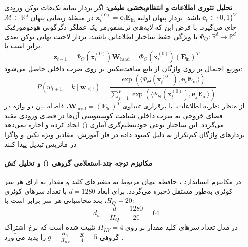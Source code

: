 \textbf{تحلیل تئوری اطلاعات و انتظام‌بخشی طیفی:}
اگر بردار نمایه تک‌هات توکن ورودی $\mathbf{e}_t \in \{0, 1\}^V$ باشد، بردار پنهان اولیه $\mathbf{x}_t^{(0)} = \mathbf{e}_t \mathbf{E}_{\text{in}}$ در منیفلد ریمانی پنهان $\mathcal{M} \subset \mathbb{R}^d$ جای می‌گیرد. با فرض این که لایه‌های ترنسفورمر یک عملگر دگرگونی هومومورفیک $\Phi_\Theta: \mathbb{R}^d \to \mathbb{R}^d$ با ویژگی حفظ ساختار اطلاعاتی باشند، بردار لاجیت نهایی توکن بعدی برابر است با:
\begin{equation}
    \mathbf{z}_{t+1} = \Phi_\Theta(\mathbf{x}_t^{(0)}) \mathbf{W}_{\text{head}} = \Phi_\Theta(\mathbf{x}_t^{(0)}) (\mathbf{E}_{\text{in}})^T
\end{equation}
توزیع احتمال بر روی واژگان از تابع سافت‌مکس بر روی ضرب داخلی حاصل می‌شود:
\begin{equation}
    P(w_{t+1} = k \mid \mathbf{w}_{\le t}) = \frac{\exp\left(\langle \Phi_\Theta(\mathbf{x}_t^{(0)}), \mathbf{e}_k \mathbf{E}_{\text{in}} \rangle\right)}{\sum_{j=1}^V \exp\left(\langle \Phi_\Theta(\mathbf{x}_t^{(0)}), \mathbf{e}_j \mathbf{E}_{\text{in}} \rangle\right)}
\end{equation}
از منظر نظریه اطلاعات، با برقراری تساوی $\mathbf{W}_{\text{head}} = (\mathbf{E}_{\text{in}})^T$، فاصله بین دو واژه در فضای خروجی به ضرب داخلی شباهت کوسینوسی آن‌ها در فضای ورودی مقید می‌گردد. این ساختار نوعی خودتنظیم‌گری آماری () ایجاد کرده و اجازه نمی‌دهد بردارهای واژگان کم‌تکرار به دلیل کمبود داده در فاز آموزش، مقادیر ویژه تکین و واگرا در ماتریس تبدیل پیدا کنند.

\paragraph*{مکانیزم توجه چند-استعلامی گروهی () و تحلیل کش}
در مکانیزم استاندارد ، حافظه پنهان مربوط به متغیرهای کلید و مقدار به ازای هر سر کوئری به‌طور مستقل ذخیره می‌گردد. برای ابعاد $d = 1280$ با تعداد سرهای کوئری $H_Q = 20$، بعد محاسباتی هر سر برابر است با:
\begin{equation}
    d_h = \frac{d}{H_Q} = \frac{1280}{20} = 64
\end{equation}
در مدل  تعداد سرهای کلید-مقدار بر روی $H_{KV} = 4$ تثبیت شده است که نرخ اشتراک گروهی $g = \frac{H_Q}{H_{KV}} = \frac{20}{4} = 5$ را پدید می‌آورد \cite{ainslie2023gqa}.


